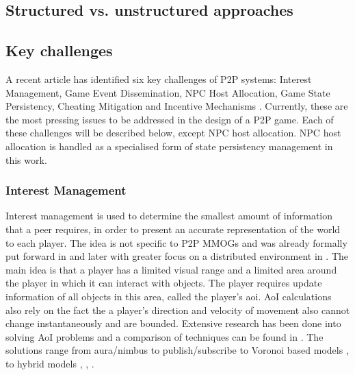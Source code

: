 \documentclass[journal,oneside,a4paper,onecolumn]{IEEEtran}
\begin{document}
\subsection{Structured vs. unstructured approaches}
\label{overlays}

\cite{pastry}

\subsection{Key challenges}
\label{key_challenges}

A recent article has identified six key challenges of P2P systems: Interest Management, Game Event Dissemination, NPC Host Allocation, Game State Persistency, Cheating Mitigation and Incentive Mechanisms \cite{Fan_deisgn_issues_p2p}. Currently, these are the most pressing issues to be addressed in the design of a P2P game. Each of these challenges will be described below, except NPC host allocation. NPC host allocation is handled as a specialised form of state persistency management in this work.



\subsubsection{Interest Management}
Interest management is used to determine the smallest amount of information that a peer requires, in order to present an accurate representation of the world to each player. The idea is not specific to P2P MMOGs and was already formally put forward in \cite{First_IM} and later with greater focus on a distributed environment in \cite{Whang_agent_based_IM}. The main idea is that a player has a limited visual range and a limited area around the player in which it can interact with objects. The player requires update information of all objects in this area, called the player's \ac{aoi}. AoI calculations also rely on the fact the a player's direction and velocity of movement also cannot change instantaneously and are bounded. Extensive research has been done into solving AoI problems and a comparison of techniques can be found in \cite{Boulanger_IM_compare}. The solutions range from aura/nimbus \cite{Benford_spatial_IM} to publish/subscribe \cite{mercury_publish_subscribe} to Voronoi based models \cite{Hu_voronoi_IM}, \cite{Buyukkaya_voronoi_state_management} to hybrid models \cite{hybrid_IM}, \cite{MOPAR}, \cite{fan_mediator_paper}.
\end{document}
